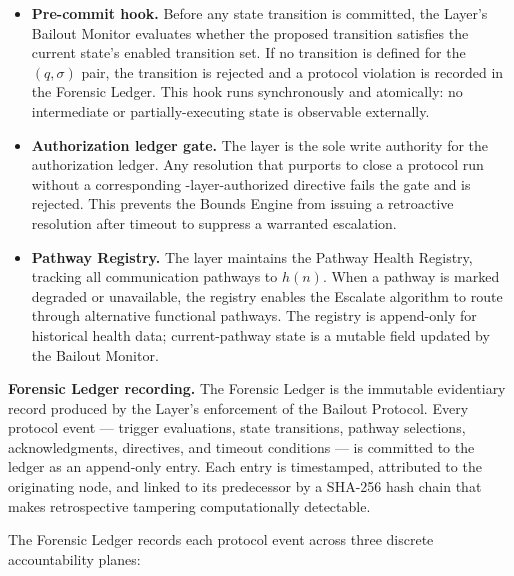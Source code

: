 \begin{itemize}\itemsep=0pt
\item[(\textit{i})] \textbf{Pre-commit hook.} Before any state transition is committed, the \fact{} Layer's Bailout Monitor evaluates whether the proposed transition satisfies the current state's enabled transition set. If no transition is defined for the $(q, \sigma)$ pair, the transition is rejected and a protocol violation is recorded in the Forensic Ledger. This hook runs synchronously and atomically: no intermediate or partially-executing state is observable externally.

\item[(\textit{ii})] \textbf{Authorization ledger gate.} The \fact{} layer is the sole write authority for the authorization ledger. Any resolution that purports to close a protocol run without a corresponding \purpose{}-layer-authorized directive fails the gate and is rejected. This prevents the Bounds Engine from issuing a retroactive resolution after timeout to suppress a warranted escalation.

\item[(\textit{iii})] \textbf{Pathway Registry.} The \fact{} layer maintains the Pathway Health Registry, tracking all communication pathways to $h(n)$. When a pathway is marked degraded or unavailable, the registry enables the Escalate algorithm to route through alternative functional pathways. The registry is append-only for historical health data; current-pathway state is a mutable field updated by the Bailout Monitor.
\end{itemize}

\medskip
\noindent\textbf{Forensic Ledger recording.} The Forensic Ledger is the immutable evidentiary record produced by the \fact{} Layer's enforcement of the Bailout Protocol. Every protocol event — trigger evaluations, state transitions, pathway selections, acknowledgments, directives, and timeout conditions — is committed to the ledger as an append-only entry. Each entry is timestamped, attributed to the originating node, and linked to its predecessor by a SHA-256 hash chain that makes retrospective tampering computationally detectable.

The Forensic Ledger records each protocol event across three discrete accountability planes:

